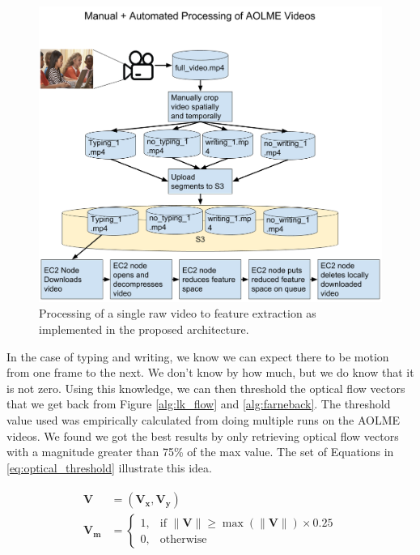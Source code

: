 \begin{figure}[h]
  \centering
  \includegraphics[width=\textwidth]{figures/life_of_video}
  \caption{Processing of a single raw video to feature extraction as implemented
  in the proposed architecture.}
  \label{fig:life_of_video}
\end{figure}

\FloatBarrier

In the case of typing and writing, we know we can expect there to be motion from
one frame to the next. We don't know by how much, but we do know that it is not
zero. Using this knowledge, we can then threshold the optical flow vectors that
we get back from Figure \ref{alg:lk_flow} and \ref{alg:farneback}. The
threshold value used was empirically calculated from doing multiple runs on the
AOLME videos. We found we got the best results by only retrieving
optical flow vectors with a magnitude greater than 75\% of the max value. The set
of Equations in \ref{eq:optical_threshold} illustrate this idea.

\begin{align}
  \begin{split}
  \mathbf{V} &= (\mathbf{V_x}, \mathbf{V_y}) \\
  \mathbf{V_m} &=
  \begin{cases}
    1, & \text{if } \|\mathbf{V}\| \geq \max( \|\mathbf{V}\|) \times 0.25 \\
    0, & \text{otherwise}
  \end{cases}
  \end{split}
  \label{eq:optical_threshold}
\end{align}

